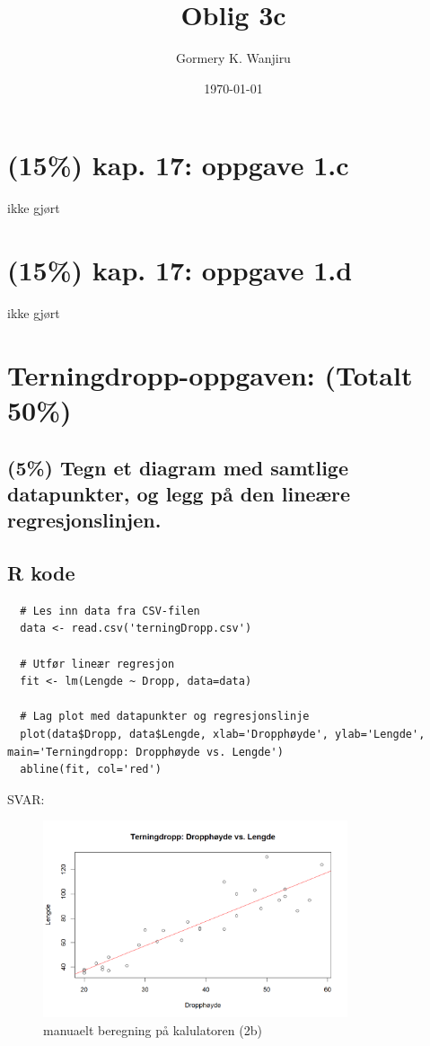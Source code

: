\documentclass[12pt]{article}
\title{Oblig 3c}
\author{Gormery K. Wanjiru}
\date{\today}
\begin{document}
\maketitle

\newpage
\tableofcontents

\newpage

\section{(15\%) kap. 17: oppgave 1.c}
ikke gjørt

\section{(15\%) kap. 17: oppgave 1.d}
ikke gjørt
\section{Terningdropp-oppgaven: (Totalt 50\%)}
\subsection{(5\%) Tegn et diagram med samtlige datapunkter, og legg på den lineære regresjonslinjen.}
\subsection{R kode}
\begin{verbatim}
  # Les inn data fra CSV-filen
  data <- read.csv('terningDropp.csv')
  
  # Utfør lineær regresjon
  fit <- lm(Lengde ~ Dropp, data=data)
  
  # Lag plot med datapunkter og regresjonslinje
  plot(data$Dropp, data$Lengde, xlab='Dropphøyde', ylab='Lengde', main='Terningdropp: Dropphøyde vs. Lengde')
  abline(fit, col='red')  
\end{verbatim}  
SVAR:
\begin{figure}[H]
  \centering
  \includegraphics[width=0.8\textwidth]{3a.png}
  \caption{manuaelt beregning på kalulatoren (2b)}
\end{figure}
\end{document}
